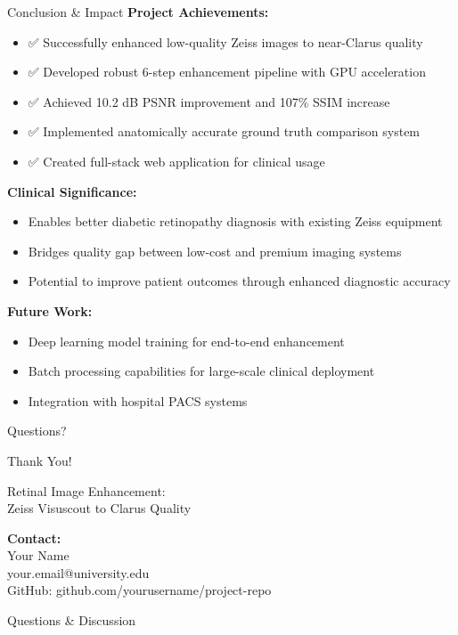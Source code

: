 \documentclass[aspectratio=169]{beamer}
\begin{document}
\begin{frame}{Conclusion \& Impact}
\textbf{Project Achievements:}
\begin{itemize}
    \item ✅ Successfully enhanced low-quality Zeiss images to near-Clarus quality
    \item ✅ Developed robust 6-step enhancement pipeline with GPU acceleration
    \item ✅ Achieved 10.2 dB PSNR improvement and 107\% SSIM increase
    \item ✅ Implemented anatomically accurate ground truth comparison system
    \item ✅ Created full-stack web application for clinical usage
\end{itemize}

\vspace{0.3cm}

\textbf{Clinical Significance:}
\begin{itemize}
    \item Enables better diabetic retinopathy diagnosis with existing Zeiss equipment
    \item Bridges quality gap between low-cost and premium imaging systems
    \item Potential to improve patient outcomes through enhanced diagnostic accuracy
\end{itemize}

\vspace{0.3cm}

\textbf{Future Work:}
\begin{itemize}
    \item Deep learning model training for end-to-end enhancement
    \item Batch processing capabilities for large-scale clinical deployment
    \item Integration with hospital PACS systems
\end{itemize}
\end{frame}

\begin{frame}{Questions?}
\begin{center}
{\Huge Thank You!}

\vspace{1cm}

{\Large Retinal Image Enhancement:\\Zeiss Visuscout to Clarus Quality}

\vspace{1cm}

\textbf{Contact:}\\
Your Name\\
your.email@university.edu\\
GitHub: github.com/yourusername/project-repo

\vspace{0.5cm}

{\large Questions \& Discussion}
\end{center}
\end{frame}
\end{document}
